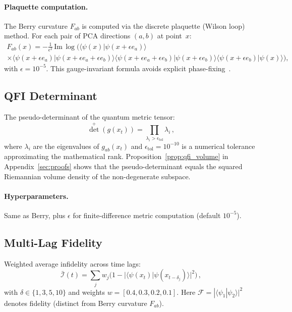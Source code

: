 \documentclass[3p]{elsarticle}
\newcommand{\braket}[2]{\langle#1|#2\rangle}
\newcommand{\calF}{\mathcal{F}}       %
\begin{document}
\paragraph{Plaquette computation.}
The Berry curvature $F_{ab}$ is computed via the discrete plaquette
(Wilson loop) method.  For each pair of PCA directions $(a,b)$ at
point~$x$:
\begin{multline}\label{eq:plaquette}
  F_{ab}(x) = -\frac{1}{\epsilon^2}\,
    \mathrm{Im}\,\log\bigl(
    \braket{\psi(x)}{\psi(x{+}\epsilon e_a)} \\
    \times\braket{\psi(x{+}\epsilon e_a)}{\psi(x{+}\epsilon e_a{+}\epsilon e_b)}
    \braket{\psi(x{+}\epsilon e_a{+}\epsilon e_b)}{\psi(x{+}\epsilon e_b)}
    \braket{\psi(x{+}\epsilon e_b)}{\psi(x)}
  \bigr),
\end{multline}
with $\epsilon = 10^{-5}$.  This gauge-invariant formula avoids
explicit phase-fixing~\cite{berry1984,simon1983}.

\subsection{QFI Determinant}\label{subsec:qfi}

The pseudo-determinant of the quantum metric tensor:
\begin{equation}\label{eq:qfi_det}
  \det^+(g(x_t)) = \prod_{\lambda_i > \epsilon_{\mathrm{tol}}} \lambda_i\,,
\end{equation}
where $\lambda_i$ are the eigenvalues of $g_{ab}(x_t)$ and
$\epsilon_{\mathrm{tol}} = 10^{-10}$ is a numerical tolerance
approximating the mathematical rank.
Proposition~\ref{prop:qfi_volume} in Appendix~\ref{sec:proofs}
shows that the pseudo-determinant equals the squared Riemannian
volume density of the non-degenerate subspace.

\paragraph{Hyperparameters.}  Same as Berry, plus $\epsilon$ for
finite-difference metric computation (default $10^{-5}$).

\subsection{Multi-Lag Fidelity}\label{subsec:mlf}

Weighted average infidelity across time lags:
\begin{equation}\label{eq:multilag}
  \bar{\mathcal{I}}(t) = \sum_{j} w_j \bigl(
  1 - |\braket{\psi(x_t)}{\psi(x_{t-\delta_j})}|^2
  \bigr)\,,
\end{equation}
with $\delta \in \{1, 3, 5, 10\}$ and weights
$w = [0.4, 0.3, 0.2, 0.1]$.  Here $\calF = |\braket{\psi_1}{\psi_2}|^2$
denotes fidelity (distinct from Berry curvature $F_{ab}$).
\end{document}
